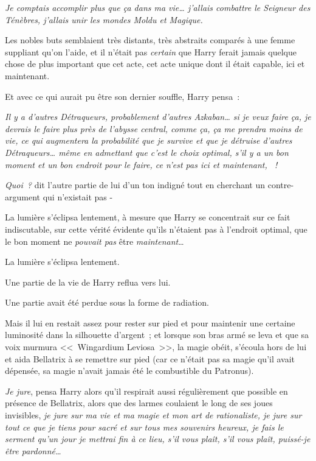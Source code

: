 \emph{Je comptais accomplir plus que ça dans ma vie… j'allais combattre le Seigneur des Ténèbres, j'allais unir les mondes Moldu et Magique.}

Les nobles buts semblaient très distants, très abstraits comparés à une femme suppliant qu'on l'aide, et il n'était pas \emph{certain} que Harry ferait jamais quelque chose de plus important que cet acte, cet acte unique dont il était capable, ici et maintenant.

Et avec ce qui aurait pu être son dernier souffle, Harry pensa~:

\emph{Il y a d'autres Détraqueurs, probablement d'autres Azkaban… si je veux faire ça, je devrais le faire plus près de l'abysse central, comme ça, ça me prendra moins de vie, ce qui augmentera la probabilité que je survive et que je détruise d'autres Détraqueurs… même en admettant que c'est le choix optimal, s'il y a un bon moment et un bon endroit pour le faire, ce n'est pas ici et maintenant, ~!}

\emph{Quoi~?} dit l'autre partie de lui d'un ton indigné tout en cherchant un contre-argument qui n'existait pas -

La lumière s'éclipsa lentement, à mesure que Harry se concentrait sur ce fait indiscutable, sur cette vérité évidente qu'ils n'étaient pas à l'endroit optimal, que le bon moment ne \emph{pouvait pas} être \emph{maintenant}…

La lumière s'éclipsa lentement.

Une partie de la vie de Harry reflua vers lui.

Une partie avait été perdue sous la forme de radiation.

Mais il lui en restait assez pour rester sur pied et pour maintenir une certaine luminosité dans la silhouette d'argent~; et lorsque son bras armé se leva et que sa voix murmura <<~Wingardium Leviosa~>>, la magie obéit, s'écoula hors de lui et aida Bellatrix à se remettre sur pied (car ce n'était pas sa magie qu'il avait dépensée, sa magie n'avait jamais été le combustible du Patronus).

\emph{Je jure}, pensa Harry alors qu'il respirait aussi régulièrement que possible en présence de Bellatrix, alors que des larmes coulaient le long de ses joues invisibles, \emph{je jure sur ma vie et ma magie et mon art de rationaliste, je jure sur tout ce que je tiens pour sacré et sur tous mes souvenirs heureux, je fais le serment qu'un jour je mettrai fin à ce lieu, s'il vous plaît, s'il vous plaît, puissé-je être pardonné…}

